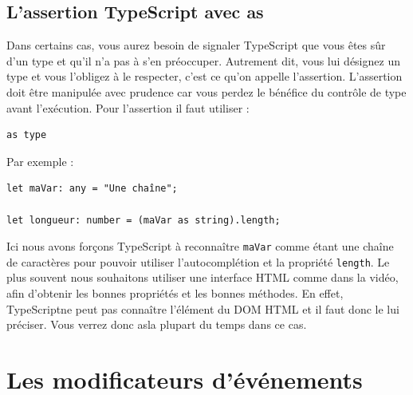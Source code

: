 \documentclass{article}
\begin{document}
\subsection{L'assertion {\color{monOrange}TypeScript} avec {\color{monOrange}as}}
Dans certains cas, vous aurez besoin de signaler {\color{monOrange}TypeScript} que vous êtes sûr d'un type et qu'il n'a pas à s'en préoccuper. Autrement dit, vous lui désignez un type et vous l'obligez à le respecter, c'est ce qu'on appelle l'assertion. L'assertion doit être manipulée avec prudence car vous perdez le bénéfice du contrôle de type avant l'exécution. Pour l'assertion il faut utiliser :
\begin{verbatim}
as type
\end{verbatim}
Par exemple :
\begin{verbatim}
let maVar: any = "Une chaîne";

let longueur: number = (maVar as string).length;
\end{verbatim}
Ici nous avons forçons {\color{monOrange}TypeScript} à reconnaître {\tt maVar} comme étant une chaîne de caractères pour pouvoir utiliser l'autocomplétion et la propriété {\tt length}. Le plus souvent nous souhaitons utiliser une interface HTML comme dans la vidéo, afin d'obtenir les bonnes propriétés et les bonnes méthodes. En effet, TypeScriptne peut pas connaître l'élément du DOM HTML et il faut donc le lui préciser. Vous verrez donc asla plupart du temps dans ce cas.



\section{Les modificateurs d'événements}
\end{document}
